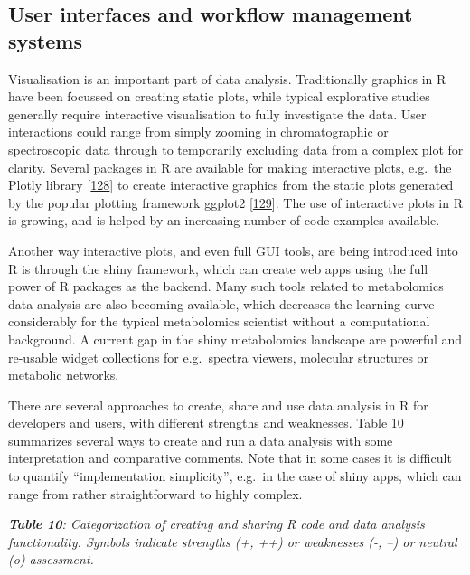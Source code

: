 \documentclass[]{article}
\begin{document}
\hypertarget{user-interfaces-and-workflow-management-systems}{%
\subsection{User interfaces and workflow management systems}\label{user-interfaces-and-workflow-management-systems}}

Visualisation is an important part of data analysis. Traditionally graphics in R have been focussed on creating static plots, while typical explorative studies generally require interactive visualisation to fully investigate the data. User interactions could range from simply zooming in chromatographic or spectroscopic data through to temporarily excluding data from a complex plot for clarity. Several packages in R are available for making interactive plots, e.g.~the Plotly library {[}\protect\hyperlink{ref-plotlytechnologiesinc_website_2015}{128}{]} to create interactive graphics from the static plots generated by the popular plotting framework ggplot2 {[}\protect\hyperlink{ref-wickham_2016}{129}{]}. The use of interactive plots in R is growing, and is helped by an increasing number of code examples available.

Another way interactive plots, and even full GUI tools, are being introduced into R is through the shiny framework, which can create web apps using the full power of R packages as the backend. Many such tools related to metabolomics data analysis are also becoming available, which decreases the learning curve considerably for the typical metabolomics scientist without a computational background. A current gap in the shiny metabolomics landscape are powerful and re-usable widget collections for e.g.~spectra viewers, molecular structures or metabolic networks.

There are several approaches to create, share and use data analysis in R for developers and users, with different strengths and weaknesses. Table 10 summarizes several ways to create and run a data analysis with some interpretation and comparative comments. Note that in some cases it is difficult to quantify ``implementation simplicity'', e.g.~in the case of shiny apps, which can range from rather straightforward to highly complex.

\emph{\textbf{Table 10}: Categorization of creating and sharing R code and data analysis functionality. Symbols indicate strengths (+, ++) or weaknesses (-, --) or neutral (o) assessment.}
\end{document}
